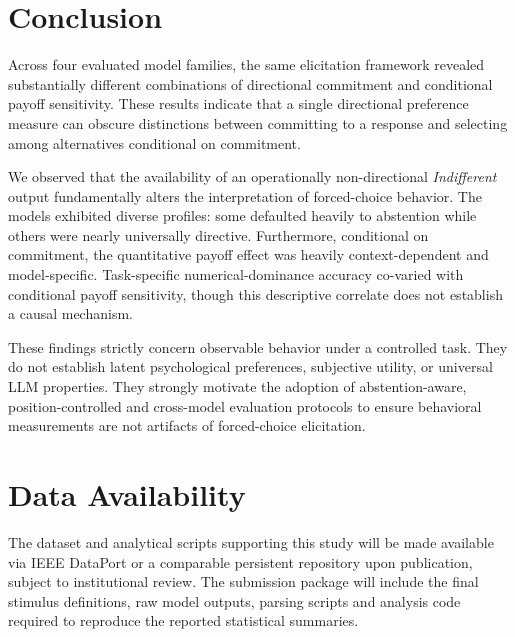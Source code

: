 \documentclass[10pt,journal,compsoc]{IEEEtran}
\begin{document}
\section{Conclusion}
\label{sec:conclusion}

Across four evaluated model families, the same elicitation framework revealed substantially different combinations of directional commitment and conditional payoff sensitivity. These results indicate that a single directional preference measure can obscure distinctions between committing to a response and selecting among alternatives conditional on commitment.

We observed that the availability of an operationally non-directional \textit{Indifferent} output fundamentally alters the interpretation of forced-choice behavior. The models exhibited diverse profiles: some defaulted heavily to abstention while others were nearly universally directive. Furthermore, conditional on commitment, the quantitative payoff effect was heavily context-dependent and model-specific. Task-specific numerical-dominance accuracy co-varied with conditional payoff sensitivity, though this descriptive correlate does not establish a causal mechanism.

These findings strictly concern observable behavior under a controlled task. They do not establish latent psychological preferences, subjective utility, or universal LLM properties. They strongly motivate the adoption of abstention-aware, position-controlled and cross-model evaluation protocols to ensure behavioral measurements are not artifacts of forced-choice elicitation.

\section*{Data Availability}
The dataset and analytical scripts supporting this study will be made available via IEEE DataPort or a comparable persistent repository upon publication, subject to institutional review. The submission package will include the final stimulus definitions, raw model outputs, parsing scripts and analysis code required to reproduce the reported statistical summaries.



\end{document}
